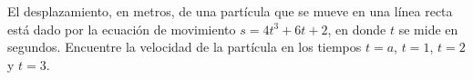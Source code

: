 \item El desplazamiento, en metros, de una partícula que se mueve en una línea recta está dado por la ecuación de movimiento $s = 4t^3 + 6t + 2$, en donde $t$ se mide en segundos. Encuentre la velocidad de la partícula en los tiempos $t = a$, $t = 1$, $t = 2$ y $t = 3$.

